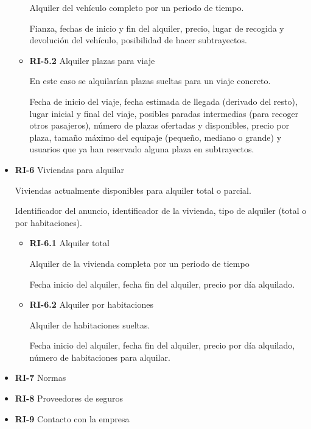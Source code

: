 \documentclass[11pt,spanish]{article} %
\begin{document}
\begin{itemize}
\begin{itemize}
		Alquiler del vehículo completo por un periodo de tiempo.

		Fianza, fechas de inicio y fin del alquiler, precio, lugar de recogida y devolución del vehículo, posibilidad de hacer subtrayectos.

		\item \textbf{RI-5.2} Alquiler plazas para viaje

		En este caso se alquilarían plazas sueltas para un viaje concreto.

		Fecha de inicio del viaje, fecha estimada de llegada (derivado del resto), lugar inicial y final del viaje, posibles paradas intermedias (para recoger otros pasajeros), número de plazas ofertadas y disponibles, precio por plaza, tamaño máximo del equipaje (pequeño, mediano o grande) y usuarios que ya han reservado alguna plaza en subtrayectos.
	\end{itemize}

	\item \textbf{RI-6} Viviendas para alquilar

	Viviendas actualmente disponibles para alquiler total o parcial.

	Identificador del anuncio, identificador de la vivienda, tipo de alquiler (total o por habitaciones).

	\begin{itemize}
		\item \textbf{RI-6.1} Alquiler total

		Alquiler de la vivienda completa por un periodo de tiempo

		Fecha inicio del alquiler, fecha fin del alquiler, precio por día alquilado.

		\item \textbf{RI-6.2} Alquiler por habitaciones

		Alquiler de habitaciones sueltas.

		Fecha inicio del alquiler, fecha fin del alquiler, precio por día alquilado, número de habitaciones para alquilar.
	\end{itemize}

	\item \textbf{RI-7} Normas
	\item \textbf{RI-8} Proveedores de seguros
	\item \textbf{RI-9} Contacto con la empresa
\end{itemize}
\end{document}
